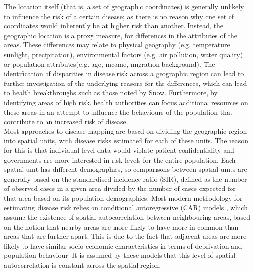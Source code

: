 The location itself (that is, a set of geographic coordinates) is generally unlikely to influence the risk of a certain disease; as there is no reason why one set of coordinates would inherently be at higher risk than another. Instead, the geographic location is a proxy measure, for differences in the attributes of the areas. These differences may relate to physical geography (e.g. temperature, sunlight, precipitation), environmental factors (e.g. air pollution, water quality) or population attributes(e.g. age, income, migration background). The identification of disparities in disease risk across a geographic region can lead to further investigation of the underlying reasons for the differences, which can lead to health breakthroughs such as those noted by Snow. Furthermore, by identifying areas of high risk, health authorities can focus additional resources on these areas in an attempt to influence the behaviours of the population that contribute to an increased risk of disease. \\
Most approaches to disease mapping are based on dividing the geographic region into spatial units, with disease risks estimated for each of these units. The reason for this is that individual-level data would violate patient confidentiality and governments are more interested in risk levels for the entire population. Each spatial unit has different demographics, so comparisons between spatial units are generally based on the standardised incidence ratio (SIR), defined as the number of observed cases in a given area divided by the number of cases expected for that area based on its population demographics.  Most modern methodology for estimating disease risk relies on conditional autoregressive (CAR) models \cite{besag1991bayesian}, which assume the existence of spatial autocorrelation between neighbouring areas, based on the notion that nearby areas are more likely to have more in common than areas that are further apart. This is due to the fact that adjacent areas are more likely to have similar socio-economic characteristics in terms of deprivation and population behaviour. It is assumed by these models that this level of spatial autocorrelation is constant across the spatial region.
\clearpage
